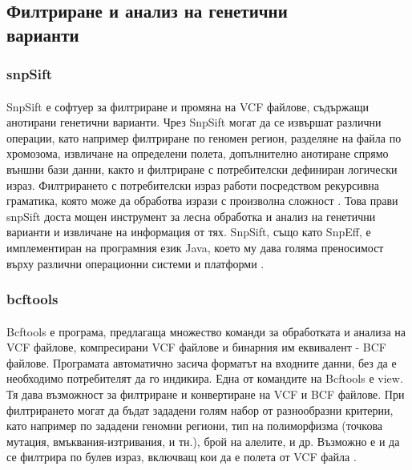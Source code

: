 \documentclass[pdftex,cyrillic,14pt,a4page,twoside,openright]{extreport}
\begin{document}
\subsection[Филтриране и анализ на генетични варианти]{Филтриране и анализ на генетични\\ варианти}
\subsubsection{snpSift}
\paragraph{}
SnpSift е софтуер за филтриране и промяна на VCF файлове, съдържащи анотирани генетични варианти. Чрез SnpSift могат да се извършат различни операции, като например филтриране по геномен регион, разделяне на файла по хромозома, извличане на определени полета, допълнително анотиране спрямо външни бази данни, както и филтриране с потребителски дефиниран логически израз. Филтрирането с потребителски израз работи посредством рекурсивна граматика, която може да обработва изрази с произволна сложност \cite{cingolani2012sift}. Това прави snpSift доста мощен инструмент за лесна обработка и анализ на генетични варианти и извличане на информация от тях. SnpSift, също като SnpEff, е имплементиран на програмния език Java, което му дава голяма преносимост върху различни операционни системи и платформи \cite[стр. 9-10]{schildt2020complete}.

\subsubsection{bcftools}
\paragraph{}
Bcftools е програма, предлагаща множество команди за обработката и анализа на VCF файлове, компресирани VCF файлове и бинарния им еквивалент - BCF файлове. Програмата автоматично засича форматът на входните данни, без да е необходимо потребителят да го индикира. Една от командите на Bcftools е view. Тя дава възможност за филтриране и конвертиране на VCF и BCF файлове. При филтрирането могат да бъдат зададени голям набор от разнообразни критерии, като например по зададени геномни региони, тип на полиморфизма (точкова мутация, вмъквания-изтривания, и тн.), брой на алелите, и др. Възможно е и да се филтрира по булев израз, включващ кои да е полета от VCF файла \cite{danecek2021}.
\end{document}
